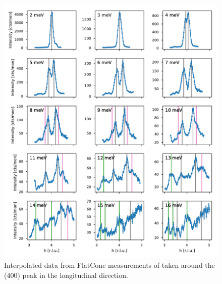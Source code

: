 \begin{figure}
    \centering
    \includegraphics[width=\textwidth]{fig/lowen/fits_400L.pdf}
    \caption[400L flatcone raw data]{Interpolated data from FlatCone measurements of \LSCOOsix{} taken around the (400) peak in the longitudinal direction.}
    \label{fig:flatcone_phonons_400L_raw}    
\end{figure}

